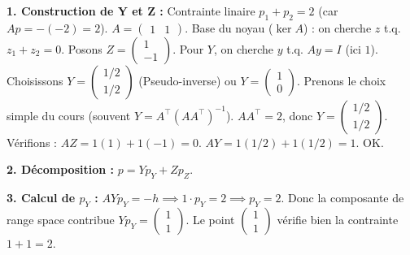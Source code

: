 \begin{correction}
\textbf{1. Construction de Y et Z :}
Contrainte linaire $p_1 + p_2 = 2$ (car $Ap = -(-2) = 2$).
$A = \begin{pmatrix} 1 & 1 \end{pmatrix}$. Base du noyau ($\ker A$) : on cherche $z$ t.q. $z_1 + z_2 = 0$.
Posons $Z = \begin{pmatrix} 1 \\ -1 \end{pmatrix}$.
Pour $Y$, on cherche $y$ t.q. $Ay = I$ (ici $1$). Choisissons $Y = \begin{pmatrix} 1/2 \\ 1/2 \end{pmatrix}$ (Pseudo-inverse) ou $Y = \begin{pmatrix} 1 \\ 0 \end{pmatrix}$.
Prenons le choix simple du cours (souvent $Y = A^\top (AA^\top)^{-1}$). $AA^\top = 2$, donc $Y = \begin{pmatrix} 1/2 \\ 1/2 \end{pmatrix}$.
Vérifions : $A Z = 1(1) + 1(-1) = 0$. $A Y = 1(1/2) + 1(1/2) = 1$. OK.

\textbf{2. Décomposition :} $p = Y p_Y + Z p_Z$.

\textbf{3. Calcul de $p_Y$ :}
$AY p_Y = -h \implies 1 \cdot p_Y = 2 \implies p_Y = 2$.
Donc la composante de range space contribue $Y p_Y = \begin{pmatrix} 1 \\ 1 \end{pmatrix}$.
Le point $\begin{pmatrix} 1 \\ 1 \end{pmatrix}$ vérifie bien la contrainte $1+1=2$.


\end{correction}
